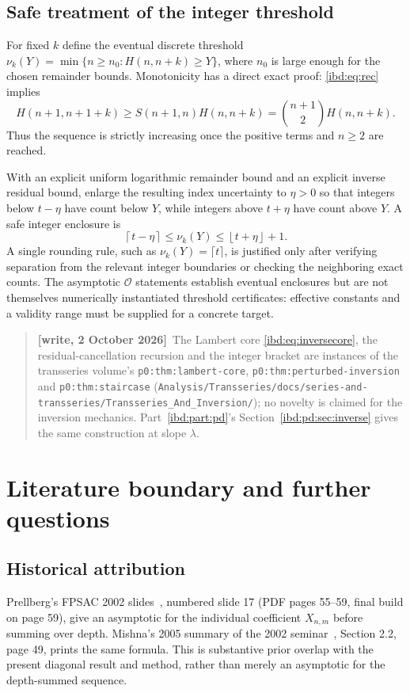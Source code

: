 \documentclass[11pt,letterpaper]{article}
\theoremstyle{remark}\newtheorem{remark}[theorem]{Remark}
\newcommand{\Oh}{\mathcal O}
\newenvironment{writenote}{\par\smallskip\begin{quote}\small\textbf{[write, 2 October 2026]}\ }{\end{quote}\smallskip}
\newcommand{\repopath}[1]{\nolinkurl{#1}}
\begin{document}
\subsection{Safe treatment of the integer threshold}
For fixed $k$ define the eventual discrete threshold
$\nu_k(Y)=\min\{n\geq n_0:H(n,n+k)\geq Y\}$, where $n_0$ is large enough for the chosen remainder bounds. Monotonicity has a direct exact proof: \eqref{ibd:eq:rec} implies
\[
 H(n+1,n+1+k)\geq S(n+1,n)H(n,n+k)
      =\binom{n+1}{2}H(n,n+k).
\]
Thus the sequence is strictly increasing once the positive terms and $n\geq2$ are reached.

With an explicit uniform logarithmic remainder bound and an explicit inverse residual bound, enlarge the resulting index uncertainty to $\eta>0$ so that integers below $t-\eta$ have count below $Y$, while integers above $t+\eta$ have count above $Y$. A safe integer enclosure is
\[
 \left\lceil t-\eta\right\rceil\leq\nu_k(Y)
       \leq\left\lfloor t+\eta\right\rfloor+1.
\]
A single rounding rule, such as $\nu_k(Y)=\lceil t\rceil$, is justified only after verifying separation from the relevant integer boundaries or checking the neighboring exact counts. The asymptotic $\Oh$ statements establish eventual enclosures but are not themselves numerically instantiated threshold certificates: effective constants and a validity range must be supplied for a concrete target.

\begin{writenote}The Lambert core \eqref{ibd:eq:inversecore}, the residual-cancellation recursion and the integer bracket are instances of the transseries volume's \texttt{p0:thm:lambert-core}, \texttt{p0:thm:perturbed-inversion} and \texttt{p0:thm:staircase} (\repopath{Analysis/Transseries/docs/series-and-transseries/Transseries_And_Inversion/}); no novelty is claimed for the inversion mechanics. Part~\ref{ibd:part:pd}'s Section~\ref{ibd:pd:sec:inverse} gives the same construction at slope $\lambda$.\end{writenote}

\section{Literature boundary and further questions}\label{ibd:sec:literature}
\subsection{Historical attribution}\label{ibd:sec:attribution}
Prellberg's FPSAC 2002 slides~\cite{prellberg2002}, numbered slide 17 (PDF pages 55--59, final build on page 59), give an asymptotic for the individual coefficient $X_{n,m}$ before summing over depth. Mishna's 2005 summary of the 2002 seminar~\cite{mishna2005}, Section 2.2, page 49, prints the same formula. This is substantive prior overlap with the present diagonal result and method, rather than merely an asymptotic for the depth-summed sequence.
\end{document}
